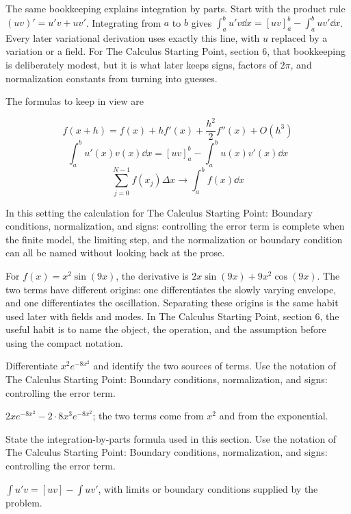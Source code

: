 The same bookkeeping explains integration by parts.  Start with the product rule \((uv)'=u'v+uv'\).  Integrating from \(a\) to \(b\) gives \(\int_a^b u'v\dd x=[uv]_a^b-\int_a^buv'\dd x\).  Every later variational derivation uses exactly this line, with \(u\) replaced by a variation or a field.  For The Calculus Starting Point, section 6, that bookkeeping is deliberately modest, but it is what later keeps signs, factors of \(2\pi\), and normalization constants from turning into guesses.

The formulas to keep in view are

\[
  f(x+h)=f(x)+hf'(x)+\frac{h^2}{2}f''(x)+O(h^3)
\]
\[
  \int_a^b u'(x)v(x)\dd x=[uv]_a^b-\int_a^b u(x)v'(x)\dd x
\]
\[
  \sum_{j=0}^{N-1}f(x_j)\Delta x\longrightarrow \int_a^b f(x)\dd x
\]

In this setting the calculation for The Calculus Starting Point: Boundary conditions, normalization, and signs: controlling the error term is complete when the finite model, the limiting step, and the normalization or boundary condition can all be named without looking back at the prose.




\begin{example}
For \(f(x)=x^2\sin(9x)\), the derivative is \(2x\sin(9x)+9x^2\cos(9x)\).  The two terms have different origins: one differentiates the slowly varying envelope, and one differentiates the oscillation.  Separating these origins is the same habit used later with fields and modes.  In The Calculus Starting Point, section 6, the useful habit is to name the object, the operation, and the assumption before using the compact notation.
\end{example}



\begin{exercise}
Differentiate \(x^2e^{-8x^2}\) and identify the two sources of terms.  Use the notation of The Calculus Starting Point: Boundary conditions, normalization, and signs: controlling the error term.
\begin{answer}
\(2xe^{-8x^2}-2\cdot 8x^3e^{-8x^2}\); the two terms come from \(x^2\) and from the exponential.
\end{answer}
\end{exercise}

\begin{exercise}
State the integration-by-parts formula used in this section.  Use the notation of The Calculus Starting Point: Boundary conditions, normalization, and signs: controlling the error term.
\begin{answer}
\(\int u'v=[uv]-\int uv'\), with limits or boundary conditions supplied by the problem.
\end{answer}
\end{exercise}



